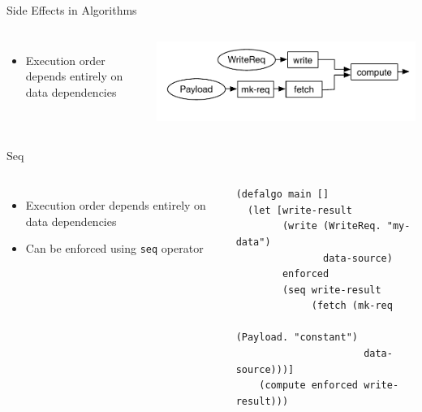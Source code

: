 \documentclass[utf8x,10pt,aspectratio=169]{beamer}
\begin{document}
\begin{frame}{Side Effects in Algorithms}
	\begin{columns}
		\begin{itemize}
			\item Execution order depends entirely on data dependencies
		\end{itemize}
		\includegraphics[width=\textwidth]{graphs/write-semantics-base}
		
	\end{columns}
\end{frame}

\begin{frame}[fragile]{Seq}
	\begin{columns}
		\column{0.4\textwidth}
		\begin{itemize}
			\item Execution order depends entirely on data dependencies
			\item Can be enforced using \texttt{seq} operator
		\end{itemize}
		\column{0.6\textwidth}
		\begin{verbatim}
(defalgo main []
  (let [write-result 
        (write (WriteReq. "my-data") 
               data-source)
        enforced 
        (seq write-result 
             (fetch (mk-req 
                      (Payload. "constant") 
                      data-source)))]
    (compute enforced write-result)))
		\end{verbatim}
		
	\end{columns}
\end{frame}
\end{document}
